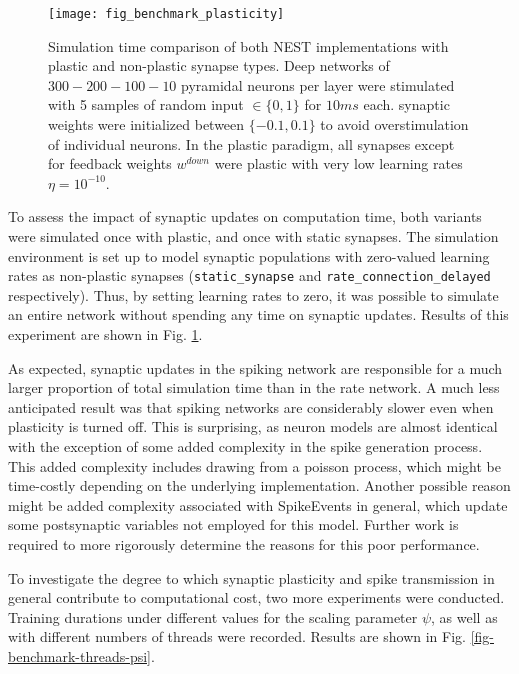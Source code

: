 \begin{figure}[h]
    \centering
    \texttt{[image: fig\_benchmark\_plasticity]}
    \caption{Simulation time comparison of both NEST implementations with plastic and non-plastic synapse types. Deep
        networks of $300-200-100-10$ pyramidal neurons per layer were stimulated with 5 samples of random input
        $\in\{0,1\}$ for $10ms$ each. synaptic weights were initialized between $\{-0.1, 0.1 \}$ to avoid
        overstimulation of individual neurons. In the plastic paradigm, all synapses except for feedback weights
        $w^{down}$ were plastic with very low learning rates $\eta = 10^{-10}$.}
    \label{fig-benchmark-plasticity}
\end{figure}


To assess the impact of synaptic updates on computation time, both variants were simulated once with plastic, and once
with static synapses. The simulation environment is set up to model synaptic populations with zero-valued learning rates
as non-plastic synapses (\texttt{static\_synapse} and \texttt{rate\_connection\_delayed} respectively). Thus, by setting
learning rates to zero, it was possible to simulate an entire network without spending any time on synaptic updates.
Results of this experiment are shown in Fig. \ref{fig-benchmark-plasticity}.

As expected, synaptic updates in the spiking network are responsible for a much larger proportion of total simulation
time than in the rate network. A much less anticipated result was that spiking networks are considerably slower even
when plasticity is turned off. This is surprising, as neuron models are almost identical with the exception of some
added complexity in the spike generation process. This added complexity includes drawing from a poisson process, which
might be time-costly depending on the underlying implementation. Another possible reason might be added complexity
associated with SpikeEvents in general, which update some postsynaptic variables not employed for this model. Further
work is required to more rigorously determine the reasons for this poor performance.\newline

\noindent To investigate the degree to which synaptic plasticity and spike transmission in general contribute to
computational cost, two more experiments were conducted. Training durations under different values for the scaling
parameter $\psi$, as well as with different numbers of threads were recorded. Results are shown in Fig.
\ref{fig-benchmark-threads-psi}.


